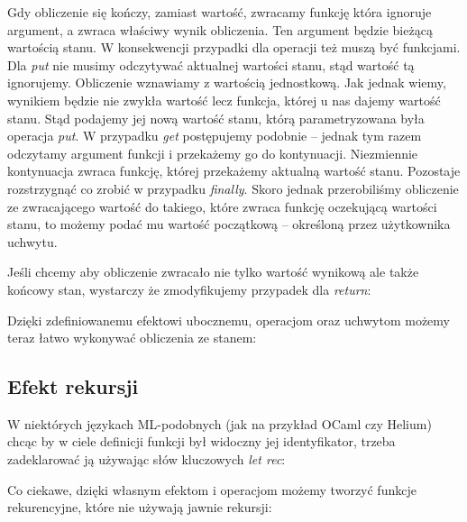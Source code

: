 

Gdy obliczenie się kończy, zamiast wartość, zwracamy funkcję która ignoruje argument, a zwraca właściwy wynik obliczenia. Ten argument będzie bieżącą wartością stanu. W konsekwencji przypadki dla operacji też muszą być funkcjami. Dla \textit{put} nie musimy odczytywać aktualnej wartości stanu, stąd wartość tą ignorujemy. Obliczenie wznawiamy z wartością jednostkową. Jak jednak wiemy, wynikiem będzie nie zwykła wartość lecz funkcja, której u nas dajemy wartość stanu. Stąd podajemy jej nową wartość stanu, którą parametryzowana była operacja \textit{put}. W przypadku \textit{get} postępujemy podobnie -- jednak tym razem odczytamy argument funkcji i przekażemy go do kontynuacji. Niezmiennie kontynuacja zwraca funkcję, której przekażemy aktualną wartość stanu. Pozostaje rozstrzygnąć co zrobić w przypadku \textit{finally}. Skoro jednak przerobiliśmy obliczenie ze zwracającego wartość do takiego, które zwraca funkcję oczekującą wartości stanu, to możemy podać mu wartość początkową -- określoną przez użytkownika uchwytu.

Jeśli chcemy aby obliczenie zwracało nie tylko wartość wynikową ale także końcowy stan, wystarczy że zmodyfikujemy przypadek dla \textit{return}:



Dzięki zdefiniowanemu efektowi ubocznemu, operacjom oraz uchwytom możemy teraz łatwo wykonywać obliczenia ze stanem:



\subsection{Efekt rekursji}

W niektórych językach ML-podobnych (jak na przykład OCaml czy Helium) chcąc by w ciele definicji funkcji był widoczny jej identyfikator, trzeba zadeklarować ją używając słów kluczowych \textit{let rec}:



Co ciekawe, dzięki własnym efektom i operacjom możemy tworzyć funkcje rekurencyjne, które nie używają jawnie rekursji:



